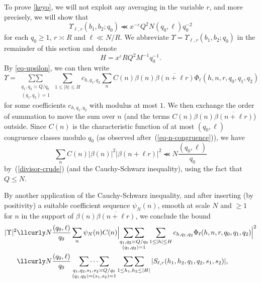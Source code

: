 \documentclass[12pt,a4paper,reqno]{amsart}
\numberwithin{equation}{section}
\theoremstyle{plain}
\theoremstyle{definition}
\newcommand\eps{\varepsilon}
\newcommand\sumsum{\mathop{\sum\sum}\limits}
\newcommand\multsum{\mathop{\sum\cdots\sum}\limits}
\renewcommand{\sim}{\asymp}
\renewcommand{\lessapprox}{\llcurly}
\begin{document}
To prove \eqref{keyo}, we will not exploit any averaging in the 
variable $r$, and more precisely, we will show that
\begin{equation}\label{eq-iv-target}
\Upsilon_{\ell,r}(b_1,b_2;q_0)
\lessapprox x^{-\eps} Q^2 N (q_0,\ell)q_0^{-2}
\end{equation}
for each $q_0 \geq 1$, $r \sim R$ and $\ell\ll N/R$.  We abbreviate
$\Upsilon=\Upsilon_{\ell,r}(b_1,b_2;q_0)$ in the remainder of this
section and denote
$$
H=x^{\eps}RQ^2M^{-1}q_0^{-1}.
$$
By \eqref{eq-upsilon}, we can then write
\begin{equation}\label{eq-start}
\Upsilon= \sumsum_{\substack{q_1,q_2 \sim Q/q_0\\ (q_1,q_2) = 1}} \sum_{1
  \leq |h| \leq H}c_{h,q_1,q_2} \sum_{n} C(n)\beta(n)
\overline{\beta(n+\ell r)} \Phi_{\ell}(h,n, r, q_0, q_1,q_2)
\end{equation}
for some coefficients $c_{h,q_1,q_2}$ with modulus at most $1$. We then
exchange the order of summation to move the sum over $n$ (and the terms $C(n) \beta(n) \overline{\beta(n+\ell r)}$) outside. Since $C(n)$
is the characteristic function of at most $(q_0,\ell)$ congruence
classes modulo $q_0$ (as observed after~(\ref{eq-n-congruence})), we
have
\begin{equation}\label{baz}
  \sum_n C(n)|\beta(n)|^2 |\beta(n+\ell r)|^2 \lessapprox 
  N\frac{(q_0,\ell)}{q_0}
\end{equation}
by~(\ref{divisor-crude}) (and the Cauchy-Schwarz inequality), using
the fact that $Q\leq N$.
\par
By another application of the Cauchy-Schwarz inequality, and after inserting (by positivity) a suitable coefficient sequence
$\psi_N(n)$, smooth at scale $N$ and $\geq 1$ for $n$ in the support
of $\beta(n)\overline{\beta(n+\ell r)}$, 
we conclude the bound
\begin{align*}
  |\Upsilon|^2&\lessapprox N\frac{(q_0,\ell)}{q_0}
  \sum_{n}\psi_N(n)C(n) \Bigl| \sumsum_{\substack{q_1,q_2 \sim Q/q_0\\
      (q_1,q_2) = 1}} \sum_{1 \leq |h|
    \leq H} c_{h,q_1,q_2} \Phi_{\ell}(h,n, r, q_0, q_1,q_2)\Bigr|^2\\
  &\lessapprox N\frac{(q_0,\ell)}{q_0}
  \multsum_{\substack{q_1,q_2,s_1,s_2\sim Q/q_0\\
      (q_1,q_2)=(s_1,s_2)=1 }} \sumsum_{1\leq h_1,h_2\leq |H|}
  |S_{\ell,r}(h_1,h_2,q_1,q_2,s_1,s_2)|,
\end{align*}
\end{document}
